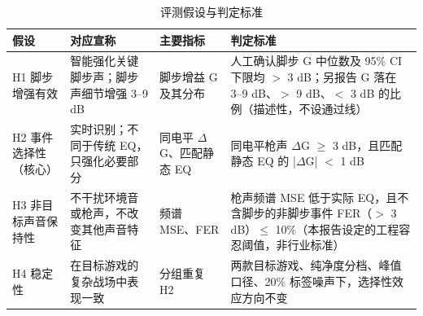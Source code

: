 \begin{table}[htbp]\centering
\caption{评测假设与判定标准}\label{tab:hyp}
{\small\begin{threeparttable}
\begin{tabularx}{\linewidth}{lLlL}\toprule
假设 & 对应宣称 & 主要指标 & 判定标准 \\
\midrule
H1 脚步增强有效 & 智能强化关键脚步声；脚步声细节增强 3--9 dB & 脚步增益 G 及其分布 & 人工确认脚步 G 中位数及 95\% CI 下限均 $>$ 3 dB；另报告 G 落在 3--9 dB、$>$ 9 dB、$<$ 3 dB 的比例（描述性，不设通过线） \\
H2 事件选择性（核心） & 实时识别；不同于传统 EQ，只强化必要部分 & 同电平 $\Delta$G、匹配静态 EQ & 同电平枪声 $\Delta$G $\geq$ 3 dB，且匹配静态 EQ 的 |$\Delta$G| $<$ 1 dB \\
H3 非目标声音保持性 & 不干扰环境音或枪声，不改变其他声音特征 & 频谱 MSE、FER & 枪声频谱 MSE 低于实际 EQ，且不含脚步的非脚步事件 FER（$>$ 3 dB）$\leq$ 10\%（本报告设定的工程容忍阈值，非行业标准） \\
H4 稳定性 & 在目标游戏的复杂战场中表现一致 & 分组重复 H2 & 两款目标游戏、纯净度分档、峰值口径、20\% 标签噪声下，选择性效应方向不变 \\
\bottomrule\end{tabularx}
\end{threeparttable}}
\end{table}
